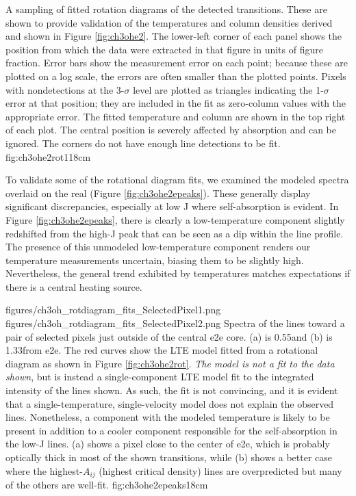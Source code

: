 \documentclass{emulateapj}
\begin{document}
{A sampling of fitted rotation diagrams of the detected \methanol transitions.
These are shown to provide validation of the temperatures and column densities
derived and shown in Figure \ref{fig:ch3ohe2}.  The lower-left corner of each
panel shows the position from which the data were extracted in that figure in
units of figure fraction.  Error bars show the measurement error on each point;
because these are plotted on a log scale, the errors are often smaller than
the plotted points.  Pixels with nondetections at the 3-$\sigma$ level are plotted
as triangles indicating the 1-$\sigma$ error at that position; they are included
in the fit as zero-column values with the appropriate error.  The fitted
temperature and column are shown in the top right of each plot.
The central position is severely affected by absorption and can be ignored.
The corners do not have enough line detections to be fit.
}{fig:ch3ohe2rot}{1}{18cm}



To validate some of the rotational diagram fits, we examined the modeled
spectra overlaid on the real (Figure \ref{fig:ch3ohe2epeaks}).  These generally
display significant discrepancies, especially at low J where self-absorption is
evident.  In Figure \ref{fig:ch3ohe2epeaks}, there is clearly a low-temperature
component slightly redshifted from the high-J peak that can be seen as a dip
within the line profile.  The presence of this unmodeled low-temperature
component renders our \methanol temperature measurements uncertain, biasing
them to be slightly high.  Nevertheless,
the general trend exhibited by \methanol temperatures matches expectations
if there is a central heating source.  



\FigureTwo
{figures/ch3oh_rotdiagram_fits_SelectedPixel1.png}
{figures/ch3oh_rotdiagram_fits_SelectedPixel2.png}
{Spectra of the \methanol lines toward a pair of selected pixels just outside
of the central e2e core. (a) is 0.55\arcsec  and (b) is 1.33\arcsec from e2e.  The red
curves show the LTE model fitted from a rotational diagram as shown in Figure
\ref{fig:ch3ohe2rot}.  \emph{The model is not a fit to the data shown}, but is instead
a single-component LTE model fit to the integrated intensity of the lines
shown.  As such, the fit is not convincing, and it is evident that a
single-temperature, single-velocity model does not explain the observed lines.
Nonetheless, a component with the modeled temperature is likely to be present
in addition to a cooler component responsible for the self-absorption in the
low-J lines.  (a) shows a pixel close to the center of e2e, which is probably
optically thick in most of the shown transitions, while (b) shows a better case
where the highest-$A_{ij}$ (highest critical density) lines are overpredicted
but many of the others are well-fit.}
{fig:ch3ohe2epeaks}{1}{8cm}
\end{document}
